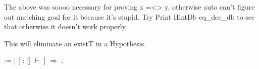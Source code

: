 \documentclass[12pt]{report}
\begin{document}
The above was soooo necessary for proving x =<> y. otherwise auto can't figure out matching goal for it because it's stupid. Try 
Print HintDb eq\_dec\_db to see that otherwise it doesn't work properly.\begin{coqdoccode}
\coqdocemptyline
\end{coqdoccode}
This will eliminate an existT in a Hypothesis.
\begin{coqdoccode}
\coqdocnoindent
{}  :=    \coqdoceol
\coqdocindent{0.50em}
\ensuremath{|} [  : [] \ensuremath{\vdash} \coqdocvar{\_} ] \ensuremath{\Rightarrow}    \coqdoceol
\coqdocnoindent
{}.\coqdoceol
\coqdocemptyline
\end{coqdoccode}
\end{document}
